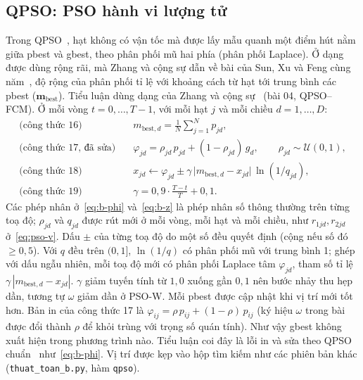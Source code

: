 \subsection{QPSO: PSO hành vi lượng tử}
\label{sec:qpso}

Trong QPSO~\cite{sun2004qpso}, hạt không có vận tốc mà được lấy mẫu quanh một điểm hút nằm giữa pbest và gbest, theo
phân phối mũ hai phía (phân phối Laplace). Ở dạng được dùng rộng rãi, mà Zhang và cộng sự dẫn về bài của Sun, Xu và Feng
cùng năm~\cite{sun2004global}, độ rộng của phân phối tỉ lệ với khoảng cách từ hạt tới trung bình các pbest
($\mathbf{m}_{\text{best}}$). Tiểu luận dùng dạng của
Zhang và cộng sự~\cite{zhang2025qpsofcm} (bài 04, QPSO--FCM). Ở mỗi vòng $t = 0, \dots, T - 1$, với mỗi hạt $j$ và mỗi
chiều $d = 1, \dots, D$:
\begin{align}
  \text{(công thức 16)}\quad & m_{\text{best},d} = \frac{1}{N} \sum_{j=1}^{N} p_{jd}, \label{eq:b-mbest}\\
  \text{(công thức 17, đã sửa)}\quad & \varphi_{jd} = \rho_{jd}\, p_{jd} + (1 - \rho_{jd})\, g_{d},
     \qquad \rho_{jd} \sim \mathcal{U}(0, 1), \label{eq:b-phi}\\
  \text{(công thức 18)}\quad & x_{jd} \leftarrow \varphi_{jd} \pm \gamma\, \big|m_{\text{best},d} - x_{jd}\big|\, \ln(1/q_{jd}), \label{eq:b-z}\\
  \text{(công thức 19)}\quad & \gamma = 0{,}9 \cdot \frac{T - t}{T} + 0{,}1. \label{eq:b-gamma}
\end{align}
Các phép nhân ở~\eqref{eq:b-phi} và~\eqref{eq:b-z} là phép nhân số thông thường trên từng toạ độ; $\rho_{jd}$ và $q_{jd}$ được
rút mới ở mỗi vòng, mỗi hạt và mỗi chiều, như $r_{1jd}, r_{2jd}$ ở~\eqref{eq:pso-v}. Dấu $\pm$ của từng toạ độ do một số đều
quyết định (cộng nếu số đó $\ge 0{,}5$). Với $q$ đều trên $(0, 1]$,
$\ln(1/q)$ có phân phối mũ với trung bình 1; ghép với dấu ngẫu nhiên, mỗi toạ độ mới có phân phối Laplace tâm
$\varphi_{jd}$, tham số tỉ lệ $\gamma\,|m_{\text{best},d} - x_{jd}|$. $\gamma$ giảm tuyến tính từ $1{,}0$ xuống
gần $0{,}1$ nên bước nhảy thu hẹp dần, tương tự $\omega$ giảm dần ở PSO-W. Mỗi pbest được cập nhật khi vị trí mới
tốt hơn. Bản in của công thức 17 là $\varphi_{ij} = \rho\, p_{ij} + (1 - \rho)\, p_{ij}$ (ký hiệu $\omega$ trong bài được đổi
thành $\rho$ để khỏi trùng với trọng số quán tính). Như vậy gbest không xuất hiện trong phương trình nào. Tiểu luận coi
đây là lỗi in và sửa theo QPSO chuẩn~\cite{sun2004qpso,sun2004global} như~\eqref{eq:b-phi}. Vị trí được kẹp vào hộp tìm
kiếm như các phiên bản khác (\texttt{thuat\_toan\_b.py}, hàm \texttt{qpso}).

